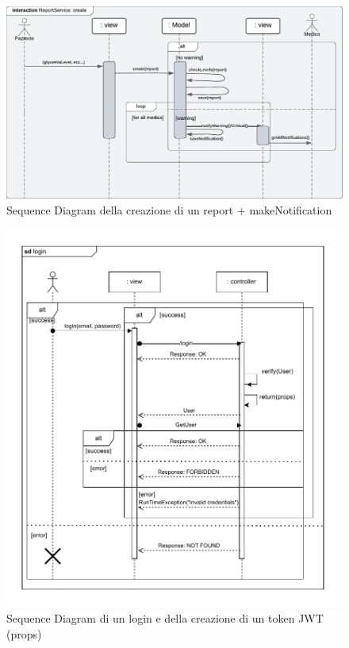 \documentclass[a4paper]{article}
\begin{document}
\begin{figure}[H]
  \begin{center}
    \includegraphics[width=1\textwidth]{sdReportCreate.pdf}
  \end{center}
  \caption{Sequence Diagram della creazione di un report + makeNotification} 
\end{figure}
\noindent

\begin{figure}[H]
  \begin{center}
    \includegraphics[width=1\textwidth]{login.pdf}
  \end{center}
  \caption{Sequence Diagram di un login e della creazione di un token JWT (props)}  
\end{figure}
\noindent
\end{document}
